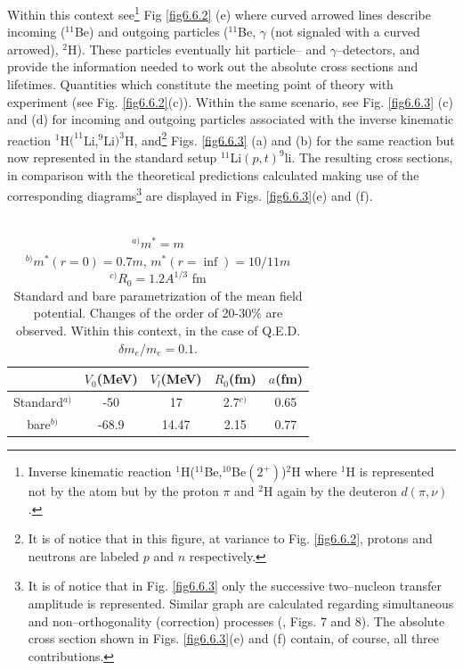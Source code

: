 Within this context see\footnote{Inverse kinematic reaction $^1$H($^{11}$Be,$^{10}$Be$(2^+)$)$^2$H where $^1$H is represented not by the atom but by the proton $\pi$ and $^2$H again by the deuteron $d(\pi,\nu)$.} Fig \ref{fig6.6.2} (e) where curved arrowed lines describe incoming ($^{11}$Be) and outgoing particles ($^{11}$Be, $\gamma$ (not signaled with a curved arrowed), $^2$H). These particles eventually hit particle-- and $\gamma$--detectors, and provide the information needed to work out the absolute cross sections and lifetimes. Quantities which constitute the meeting point of theory with experiment (see Fig. \ref{fig6.6.2}(c)). Within the same scenario, see Fig. \ref{fig6.6.3} (c) and (d)     for incoming and outgoing particles associated with the inverse kinematic reaction $^1$H$(^{11}$Li,$^9$Li$)^3$H, and\footnote{It is of notice that in this figure, at variance to Fig. \ref{fig6.6.2}, protons and neutrons are labeled $p$ and $n$ respectively.} Figs. \ref{fig6.6.3} (a) and (b) for the same reaction but now represented in the standard setup $^{11}$Li$(p,t)^9$li. The resulting cross sections, in comparison with the theoretical predictions calculated making use of the corresponding diagrams\footnote{It is of notice that in Fig. \ref{fig6.6.3} only the successive two--nucleon transfer amplitude is represented. Similar graph are calculated regarding simultaneous and non--orthogonality (correction) processes (\cite{Potel:13}, Figs. 7 and 8). The absolute cross section shown in Figs. \ref{fig6.6.3}(e) and (f) contain, of course, all three contributions.} are displayed in Figs. \ref{fig6.6.3}(e) and (f).
\begin{table}
\begin{center}
\begin{tabular}{|c|c|c|c|c|}
\hline
  & $V_0$(MeV)  & $V_l$(MeV)  & $R_0$(fm) & $a$(fm)  \\ 
 \hline 
Standard$^{a)}$  & -50  & 17  & 2.7$^{c)}$ & 0.65  \\ 
 \hline 
bare$^{b)}$  & -68.9  & 14.47  & 2.15 & 0.77  \\ 
 \hline 
\end{tabular}
\end{center}
\caption{\\$^{a)} m^*=m$\\ $^{b)} m^*(r=0)=0.7m$, $m^*(r=\inf)=10/11m$\\ $^{c)} R_0=1.2A^{1/3}$ fm\\ Standard and bare parametrization of the mean field potential. Changes of the order of 20-30\% are observed. Within this context, in the case of Q.E.D. $\delta m_e/m_e=0.1$.}\label{tab6.6.1}
\end{table} 

